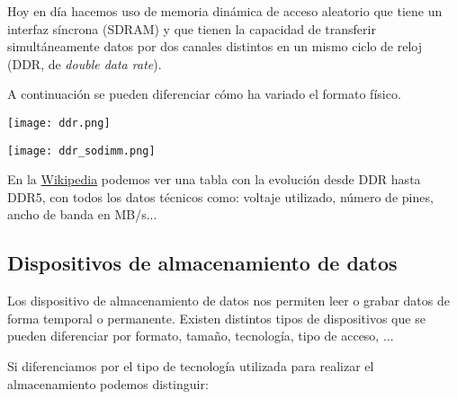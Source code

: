 Hoy en día hacemos uso de memoria dinámica de acceso aleatorio que tiene un interfaz síncrona (SDRAM) y que tienen la capacidad de transferir simultáneamente datos por dos canales distintos en un mismo ciclo de reloj (DDR, de \textit{double data rate}).

A continuación se pueden diferenciar cómo ha variado el formato físico.

{
    \hfill
\begin{minipage}{0.45\linewidth}
    \texttt{[image: ddr.png]}
    \vspace{-30pt}
\end{minipage}
\hfill\hfill
\begin{minipage}{0.3\linewidth}
    \texttt{[image: ddr\_sodimm.png]}
    \vspace{-30pt}
\end{minipage}
\hfill
}

En la \href{https://en.wikipedia.org/wiki/DDR_SDRAM#Generations}{Wikipedia} podemos ver una tabla con la evolución desde DDR hasta DDR5, con todos los datos técnicos como: voltaje utilizado, número de pines, ancho de banda en MB/s...

\hypertarget{dispositivos_almacenamiento}{}
\subsection{Dispositivos de almacenamiento de datos}

Los dispositivo de almacenamiento de datos nos permiten leer o grabar datos de forma temporal o permanente. Existen distintos tipos de dispositivos que se pueden diferenciar por formato, tamaño, tecnología, tipo de acceso, ...

Si diferenciamos por el tipo de tecnología utilizada para realizar el almacenamiento podemos distinguir:

